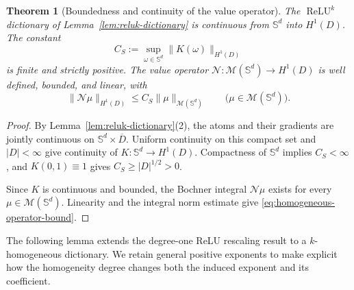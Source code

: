 \documentclass[11pt]{amsart}
\newtheorem{theorem}{Theorem}[section]
\theoremstyle{definition}
\theoremstyle{remark}
\DeclareMathOperator{\relu}{ReLU}
\newcommand{\reluk}{\relu^{k}}
\begin{document}
\begin{theorem}[Boundedness and continuity of the value operator]
\label{thm:homogeneous-operator}
The $\reluk$ dictionary of Lemma~\ref{lem:reluk-dictionary} is continuous
from $\mathbb S^d$ into $H^1(D)$.
The constant
\begin{equation*}
	C_S:=\sup_{\omega\in\mathbb S^d}\|K(\omega)\|_{H^1(D)}
\end{equation*}
is finite and strictly positive.
The value operator $\mathcal N:\mathcal M(\mathbb S^d)\to H^1(D)$ is
well defined, bounded, and linear, with
\begin{equation}
\label{eq:homogeneous-operator-bound}
	\|\mathcal N\mu\|_{H^1(D)}
	\le C_S\|\mu\|_{\mathcal M(\mathbb S^d)}
	\qquad\bigl(\mu\in\mathcal M(\mathbb S^d)\bigr).
\end{equation}
\end{theorem}
\begin{proof}
By Lemma~\ref{lem:reluk-dictionary}(2), the atoms and their gradients are
jointly continuous on $\mathbb S^d\times\overline D$. Uniform continuity
on this compact set and $|D|<\infty$ give continuity of
$K:\mathbb S^d\to H^1(D)$. Compactness of $\mathbb S^d$ implies
$C_S<\infty$, and $K(0,1)\equiv1$ gives $C_S\ge|D|^{1/2}>0$.

Since $K$ is continuous and bounded, the Bochner integral $\mathcal N\mu$
exists for every $\mu\in\mathcal M(\mathbb S^d)$. Linearity and the integral
norm estimate give \eqref{eq:homogeneous-operator-bound}.
\end{proof}

The following lemma extends the degree-one ReLU rescaling result
\cite[Appendix~F, Proposition~3]{pieper2022nonconvex} to a
$k$-homogeneous dictionary. We retain general positive exponents to make
explicit how the homogeneity degree changes both the induced exponent and its
coefficient.
\end{document}
